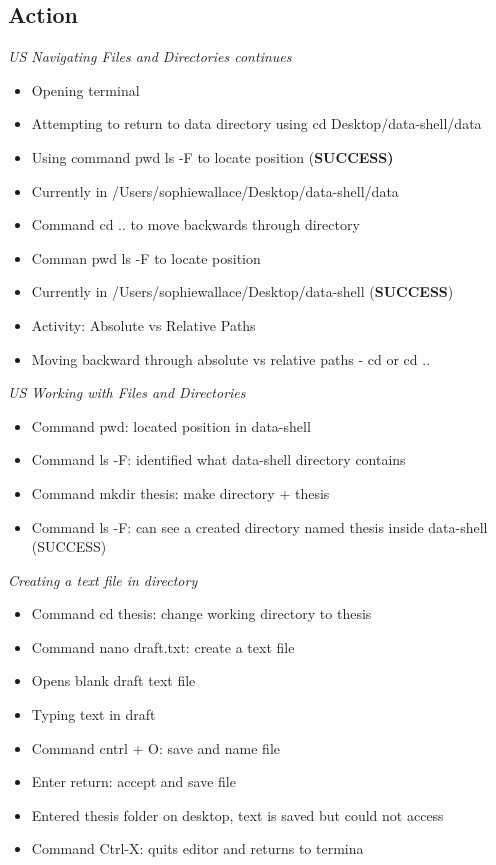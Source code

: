 \documentclass{article}
\begin{document}
\subsection{Action}
\textit{US Navigating Files and Directories continues}
\begin{itemize}
\item Opening terminal
\item Attempting to return to data directory using cd Desktop/data-shell/data
\item Using command pwd ls -F to locate position (\textbf{SUCCESS)}
\item Currently in /Users/sophiewallace/Desktop/data-shell/data
\item Command cd .. to move backwards through directory
\item Comman pwd ls -F to locate position 
\item Currently in /Users/sophiewallace/Desktop/data-shell (\textbf{SUCCESS})
\item Activity: Absolute vs Relative Paths
\item Moving backward through absolute vs relative paths - cd or cd ..
\end{itemize}
\textit{US Working with Files and Directories}
\begin{itemize}
\item Command pwd: located position in data-shell
\item Command ls -F: identified what data-shell directory contains
\item Command mkdir thesis: make directory + thesis
\item Command ls -F: can see a created directory named thesis inside data-shell (SUCCESS)
\end{itemize}
\textit{Creating a text file in directory}
\begin{itemize}
\item Command cd thesis: change working directory to thesis
\item Command nano draft.txt: create a text file 
\item Opens blank draft text file 
\item Typing text in draft 
\item Command cntrl + O: save and name file
\item Enter return: accept and save file
\item Entered thesis folder on desktop, text is saved but could not access
\item Command Ctrl-X: quits editor and returns to termina
\end{itemize}
\end{document}
